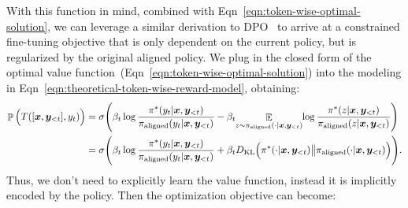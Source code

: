 





With this function in mind, combined with Eqn~\ref{eqn:token-wise-optimal-solution}, we can leverage a similar derivation to DPO~\cite{rafailov2023direct} to arrive at a constrained fine-tuning objective that is only dependent on the current policy, but is regularized by the original aligned policy. We plug in the closed form of the optimal value function~(Eqn~\ref{eqn:token-wise-optimal-solution}) into the modeling in Eqn~\ref{eqn:theoretical-token-wise-reward-model}, obtaining:
\begin{align}
    \mathop{\mathbb P}\Big(T([\bx, \by_{<t}], y_t)\Big) &= \sigma \Bigg( \beta_t  \log \frac{\pi^*(y_t|\bx, \by_{< t})}{\pialigned(y_t|\bx, \by_{<t})} - \beta_t \hspace{-.03in}\mathop{\mathbb E}_{z \sim \pialigned(\cdot |\bx, \by_{<t} ) } \hspace{-.03in} \log \frac{\pi^*(z|\bx, \by_{<t})}{\pialigned(z|\bx, \by_{<t})} \Bigg) \nonumber \\
    & = \sigma \Bigg( \beta_t  \log \frac{\pi^*(y_t|\bx, \by_{< t})}{\pialigned(y_t|\bx, \by_{<t})} + \beta_t \KL\Big(\pi^*(\cdot | \bx, \by_{<t}) \big\| \pialigned(\cdot | \bx, \by_{<t}) \Big) \Bigg).
\end{align}
Thus, we don't need to explicitly learn the value function, instead it is implicitly encoded by the policy. Then the optimization objective can become:


